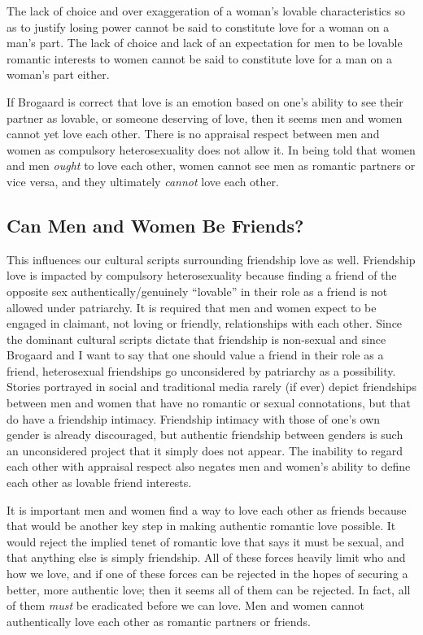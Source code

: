 The lack of choice and over exaggeration of a woman's lovable
characteristics so as to justify losing power cannot be said to
constitute love for a woman on a man's part. The lack of choice and lack
of an expectation for men to be lovable romantic interests to women
cannot be said to constitute love for a man on a woman's part either.

If Brogaard is correct that love is an emotion based on one's ability to
see their partner as lovable, or someone deserving of love, then it
seems men and women cannot yet love each other. There is no appraisal
respect between men and women as compulsory heterosexuality does not
allow it. In being told that women and men \emph{ought} to love each
other, women cannot see men as romantic partners or vice versa, and they
ultimately \emph{cannot} love each other.

\subsection{Can Men and Women Be Friends?}

This influences our cultural scripts surrounding friendship love as
well. Friendship love is impacted by compulsory heterosexuality because
finding a friend of the opposite sex authentically/genuinely ``lovable''
in their role as a friend is not allowed under patriarchy. It is
required that men and women expect to be engaged in claimant, not loving
or friendly, relationships with each other. Since the dominant cultural
scripts dictate that friendship is non-sexual and since Brogaard and I
want to say that one should value a friend in their role as a friend,
heterosexual friendships go unconsidered by patriarchy as a possibility.
Stories portrayed in social and traditional media rarely (if ever)
depict friendships between men and women that have no romantic or sexual
connotations, but that do have a friendship intimacy. Friendship
intimacy with those of one's own gender is already discouraged, but
authentic friendship between genders is such an unconsidered project
that it simply does not appear. The inability to regard each other with
appraisal respect also negates men and women's ability to define each
other as lovable friend interests.

It is important men and women find a way to love each other as friends
because that would be another key step in making authentic romantic love
possible. It would reject the implied tenet of romantic love that says
it must be sexual, and that anything else is simply friendship. All of
these forces heavily limit who and how we love, and if one of these
forces can be rejected in the hopes of securing a better, more authentic
love; then it seems all of them can be rejected. In fact, all of them
\emph{must} be eradicated before we can love. Men and women cannot
authentically love each other as romantic partners or friends.

